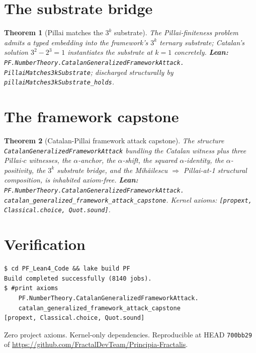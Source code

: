 \documentclass[11pt,a4paper]{article}
\theoremstyle{plain}
\newtheorem{theorem}{Theorem}[section]
\theoremstyle{definition}
\begin{document}
\section{The substrate bridge}

\begin{theorem}[Pillai matches the $3^{k}$ substrate]
\label{thm:pillai-substrate}
The Pillai-finiteness problem admits a typed embedding into the
framework's $3^{k}$ ternary substrate; Catalan's solution
$3^{2} - 2^{3} = 1$ instantiates the substrate at $k = 1$
concretely.
\textbf{Lean:}
\texttt{PF.NumberTheory.CatalanGeneralizedFrameworkAttack.\\
PillaiMatches3kSubstrate};
discharged structurally by
\texttt{pillaiMatches3kSubstrate\_holds}.
\end{theorem}

\section{The framework capstone}

\begin{theorem}[Catalan-Pillai framework attack capstone]
\label{thm:pillai-capstone}
The structure
\texttt{CatalanGeneralizedFrameworkAttack} bundling the Catalan
witness plus three Pillai-$c$ witnesses, the $\alpha$-anchor,
the $\alpha$-shift, the squared $\alpha$-identity, the
$\alpha$-positivity, the $3^{k}$ substrate bridge, and the
Mih\u{a}ilescu $\Rightarrow$ Pillai-at-1 structural composition,
is inhabited axiom-free.
\textbf{Lean:}
\texttt{PF.NumberTheory.CatalanGeneralizedFrameworkAttack.\\
catalan\_generalized\_framework\_attack\_capstone}.
Kernel axioms: \texttt{[propext, Classical.choice, Quot.sound]}.
\end{theorem}

\section{Verification}

\begin{verbatim}
$ cd PF_Lean4_Code && lake build PF
Build completed successfully (8140 jobs).
$ #print axioms
    PF.NumberTheory.CatalanGeneralizedFrameworkAttack.
    catalan_generalized_framework_attack_capstone
[propext, Classical.choice, Quot.sound]
\end{verbatim}

Zero project axioms. Kernel-only dependencies. Reproducible at
HEAD \texttt{700bb29} of
\url{https://github.com/FractalDevTeam/Principia-Fractalis}.
\end{document}
